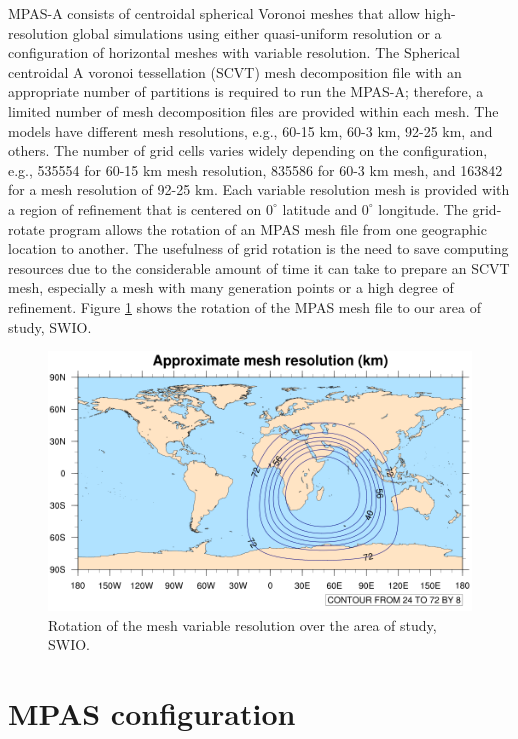 \documentclass[8pt,a4paper]{article}
\begin{document}
	MPAS-A consists of centroidal spherical Voronoi meshes that allow high-resolution global simulations using either quasi-uniform resolution or a configuration of horizontal meshes with variable resolution. The Spherical centroidal
	A voronoi tessellation (SCVT) mesh decomposition file with an appropriate number of partitions is required to run the MPAS-A; therefore, a limited number of mesh decomposition files are provided within each mesh. The models have different mesh resolutions, e.g., 60-15 km, 60-3 km, 92-25 km, and others. The number of grid cells varies widely depending on the configuration, e.g., 535554 for 60-15 km mesh resolution, 835586 for 60-3 km mesh, and 163842 for a mesh resolution of 92-25 km. Each variable resolution mesh is provided with a region of refinement that is centered on $0^{\circ}$ latitude and  $0^{\circ}$ longitude. The grid-rotate program allows the rotation of an MPAS mesh file from one geographic location to another. The usefulness of grid rotation is the need to save computing resources due to the considerable amount of time it can take to prepare an SCVT mesh, especially a mesh with many generation points or a high degree of refinement. Figure \ref{fig:ff} shows the rotation of the MPAS mesh file to our area of study, SWIO.
	
	\begin{figure}[H]
		\includegraphics[width = \linewidth]{mesh_resolution1.png}
		\caption{Rotation of the mesh variable resolution over the area of study, SWIO.}
		\label{fig:ff}
	\end{figure}
	
	
	\section{MPAS configuration}
	
\end{document}

